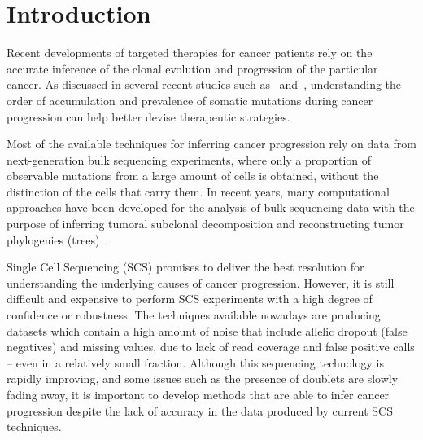 \documentclass[a4paper,USenglish]{article}
\theoremstyle{definition}
\begin{document}
\section{Introduction}

Recent developments of targeted therapies for cancer patients rely on the accurate inference of the clonal evolution and progression of the particular cancer. As discussed in several recent studies such as~\cite{Morrissy2016} and~\cite{Wang2016}, understanding the order of accumulation and prevalence of somatic mutations during cancer progression can help better devise therapeutic strategies.

Most of the available techniques for inferring cancer progression rely on data from next-generation bulk sequencing experiments, where only a proportion of observable mutations from a large amount of cells is obtained, without the distinction of the cells that carry them. In recent years, many computational approaches have been developed for the analysis of bulk-sequencing data with the purpose of inferring tumoral subclonal decomposition and reconstructing tumor phylogenies (trees)~\cite{Strino2013,Jiao2014,Hajirasouliha2014,Yuan2015,Popic2015,citup,El-Kebir2016,marass2016,doi:10.1093/bioinformatics/btx270,Bonizzoni:2017:BPP:3107411.3107441}.

Single Cell Sequencing (SCS) promises to deliver the best resolution for understanding the underlying causes of cancer progression. However, it is still difficult and expensive to perform SCS experiments with a high degree of confidence or robustness. The techniques available nowadays are producing datasets which contain a high amount of noise that include allelic dropout (false negatives) and missing values, due to lack of read coverage and false positive calls -- even in a relatively small fraction. Although this sequencing technology is rapidly improving, and some issues such as the presence of doublets are slowly fading away, it is important to develop methods that are able to infer cancer progression despite the lack of accuracy in the data produced by current SCS techniques.
\end{document}
